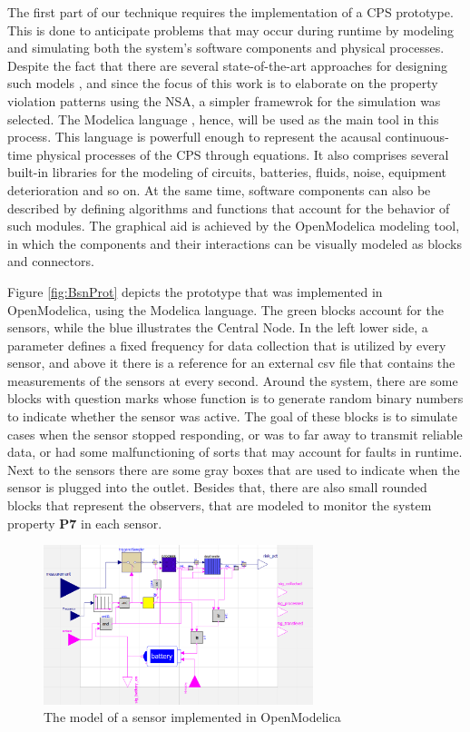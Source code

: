 The first part of our technique requires the implementation of a CPS prototype. This is done to anticipate problems that may occur during runtime by modeling and simulating both the system's software components and physical processes. Despite the fact that there are several state-of-the-art approaches for designing such models \cite{baras2019formal} \cite{deng2019modeling} \cite{bouskela2022formal}, and since the focus of this work is to elaborate on the property violation patterns using the NSA, a simpler framewrok for the simulation was selected. The Modelica language \cite{Modelica}, hence, will be used as the main tool in this process. This language is powerfull enough to represent the acausal continuous-time physical processes of the CPS through equations. It also comprises several built-in libraries for the modeling of circuits, batteries, fluids, noise, equipment deterioration and so on. At the same time, software components can also be described by defining algorithms and functions that account for the behavior of such modules. The graphical aid is achieved by the OpenModelica \cite{OpenModelica} modeling tool, in which the components and their interactions can be visually modeled as blocks and connectors.


Figure \ref{fig:BsnProt} depicts the prototype that was implemented in OpenModelica, using the Modelica language. The green blocks account for the sensors, while the blue illustrates the Central Node. In the left lower side, a parameter defines a fixed frequency for data collection that is utilized by every sensor, and above it there is a reference for an external csv file that contains the measurements of the sensors at every second. Around the system, there are some blocks with question marks whose function is to generate random binary numbers to indicate whether the sensor was active. The goal of these blocks is to simulate cases when the sensor stopped responding, or was to far away to transmit reliable data, or had some malfunctioning of sorts that may account for faults in runtime. Next to the sensors there are some gray boxes that are used to indicate when the sensor is plugged into the outlet. Besides that, there are also small rounded blocks that represent the observers, that are modeled to monitor the system property \textbf{P7} in each sensor.

\begin{figure}[!h]
	\centering
	\includegraphics[width=0.7\textwidth, keepaspectratio]{img/sensor_modelica.png}
	\caption{The model of a sensor implemented in OpenModelica}
	\label{fig:sensorProt}
\end{figure}

